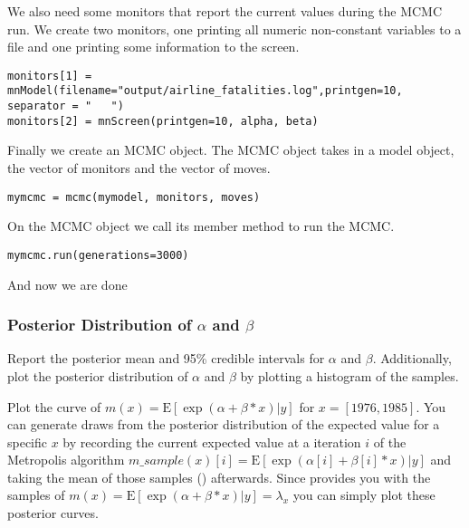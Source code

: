 We also need some monitors that report the current values during the MCMC run.
We create two monitors, one printing all numeric non-constant variables to a file and one printing some information to the screen.
{\tt \begin{snugshade*}
\begin{lstlisting} 
monitors[1] = mnModel(filename="output/airline_fatalities.log",printgen=10, separator = "	")
monitors[2] = mnScreen(printgen=10, alpha, beta)
\end{lstlisting}
\end{snugshade*}}
Finally we create an MCMC object.
The MCMC object takes in a model object, the vector of monitors and the vector of moves.
{\tt \begin{snugshade*}
\begin{lstlisting} 
mymcmc = mcmc(mymodel, monitors, moves)
\end{lstlisting}
\end{snugshade*}}
On the MCMC object we call its member method  to run the MCMC.
{\tt \begin{snugshade*}
\begin{lstlisting} 
mymcmc.run(generations=3000)
\end{lstlisting}
\end{snugshade*}}
And now we are done {\LARGE \smiley}


\subsubsection{Posterior Distribution of $\alpha$ and $\beta$}
 
Report the posterior mean and 95\% credible intervals for $\alpha$ and $\beta$. 
Additionally, plot the posterior distribution of $\alpha$ and $\beta$ by plotting a histogram of the samples. 

Plot the curve of $m(x) = \text{E}[\exp(\alpha+\beta*x)|y]$ for $x = [1976,1985]$. 
You can generate draws from the posterior distribution of the expected value for a specific $x$ by recording the current expected value at a iteration $i$ of the Metropolis algorithm $m\_sample(x)[i] = \text{E}[\exp(\alpha[i]+\beta[i]*x)|y]$ and taking the mean of those samples () afterwards. Since \RevBayes provides you with the samples of $m(x) = \text{E}[\exp(\alpha+\beta*x)|y] = \lambda_x$ you can simply plot these posterior curves.
 
